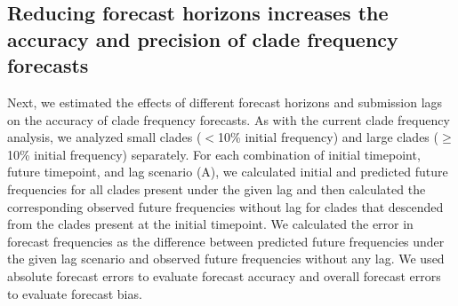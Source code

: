 \documentclass[9pt,lineno]{elife}
\begin{document}
\subsection{Reducing forecast horizons increases the accuracy and precision of clade frequency forecasts}

Next, we estimated the effects of different forecast horizons and submission lags on the accuracy of clade frequency forecasts.
As with the current clade frequency analysis, we analyzed small clades ($<$10\% initial frequency) and large clades ($\ge$10\% initial frequency) separately.
For each combination of initial timepoint, future timepoint, and lag scenario (A), we calculated initial and predicted future frequencies for all clades present under the given lag and then calculated the corresponding observed future frequencies without lag for clades that descended from the clades present at the initial timepoint.
We calculated the error in forecast frequencies as the difference between predicted future frequencies under the given lag scenario and observed future frequencies without any lag.
We used absolute forecast errors to evaluate forecast accuracy and overall forecast errors to evaluate forecast bias.
\end{document}
